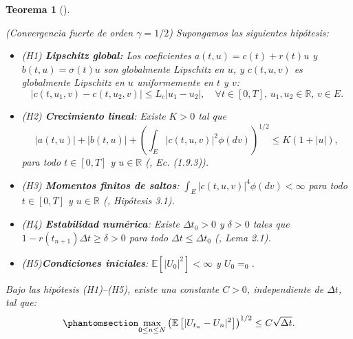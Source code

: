 \documentclass[
  spanish,
  us-letterpaper,
]{scrreprt}
\theoremstyle{plain}
\newtheorem{theorem}{Teorema}[chapter]
\theoremstyle{plain}
\theoremstyle{definition}
\theoremstyle{remark}
\begin{document}
\begin{theorem}[]\protect\hypertarget{thm-convergencia_fuerte_semi_impli}{}\label{thm-convergencia_fuerte_semi_impli}

(Convergencia fuerte de orden \(\gamma = 1/2\)) Supongamos las
siguientes hipótesis:

\begin{itemize}
\item
  \emph{(H1)} \textbf{\emph{Lipschitz global:}} Los coeficientes
  \(a(t,u) = c(t) + r(t)u\) y \(b(t,u) = \sigma(t)u\) son globalmente
  Lipschitz en \(u\), y \(c(t,u,v)\) es globalmente Lipschitz en \(u\)
  uniformemente en \(t\) y \(v\):
  \[ |c(t, u_1, v) - c(t, u_2, v)| \leq L_c |u_1 - u_2|, \quad \forall t \in [0,T], \, u_1, u_2 \in \mathbb{R}, \, v \in E.
   \tag{H1}
   \]
\item
  \emph{(H2)} \textbf{\emph{Crecimiento lineal}}: Existe \(K > 0\) tal
  que
  \[  |a(t,u)| + |b(t,u)| + \left( \int_E |c(t, u, v)|^2 \phi(dv) \right)^{1/2} \leq K(1 + |u|),
    \tag{H2}
    \] para todo \(t \in [0,T]\) y \(u \in \mathbb{R}\)
  (\textcite{platen2010numerical}, Ec. (1.9.3)).
\item
  \emph{(H3)} \textbf{\emph{Momentos finitos de saltos}}:
  \(\int_E |c(t, u, v)|^4 \phi(dv) < \infty\) para todo \(t \in [0,T]\)
  y \(u \in \mathbb{R}\) (\textcite{wang2007}, Hipótesis 3.1).
\item
  \emph{(H4)} \textbf{\emph{Estabilidad numérica}}: Existe
  \(\Delta t_0 > 0\) y \(\delta > 0\) tales que
  \(1 - r(t_{n+1})\Delta t \geq \delta > 0\) para todo
  \(\Delta t \leq \Delta t_0\) (\textcite{higham2005}, Lema 2.1).
\item
  \emph{(H5)\textbf{Condiciones iniciales}}:
  \(\mathbb{E}[|U_0|^2] < \infty\) y \(U_0 = _0\).
\end{itemize}

Bajo las hipótesis (H1)--(H5), existe una constante \(C > 0\),
independiente de \(\Delta t\), tal que:
\begin{equation}\protect\phantomsection\label{eq-convergence_result_semiimplicit}{\max_{0 \leq n \leq N} \left( \mathbb{E}\left[ |U_{t_n} - U_n|^2 \right] \right)^{1/2} \leq C \sqrt{\Delta t}.}\end{equation}

\end{theorem}
\end{document}
